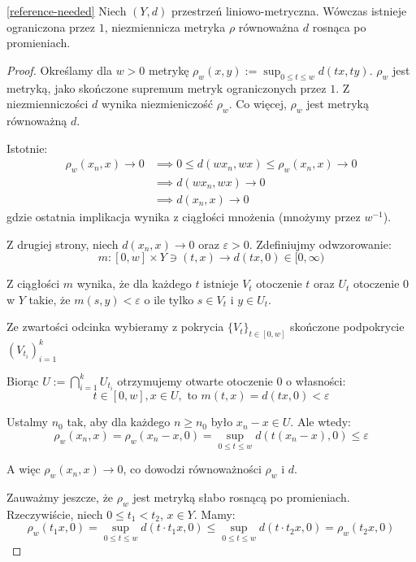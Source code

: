 \begin{thm} \label{thm:eidelheit-mazur} \ref{reference-needed}
  Niech $(Y, d)$ przestrzeń liniowo-metryczna. Wówczas istnieje ograniczona przez $1$, niezmiennicza metryka $\rho$ równoważna $d$ rosnąca po promieniach.
  \begin{proof}
    Określamy dla $w > 0$ metrykę $\rho_w(x, y) := \sup_{0 \leq t \leq w} d(tx, ty)$. $\rho_w$ jest metryką, jako skończone supremum metryk ograniczonych przez $1$. Z niezmienniczości $d$ wynika niezmieniczość $\rho_w$. Co więcej, $\rho_w$ jest metryką równoważną $d$.
    
    Istotnie:
    \begin{align*}
      \rho_w(x_n, x) \to 0 &\implies 0 \leq d(w x_n, wx) \leq \rho_w(x_n,x)  \to 0 \\
      &\implies d(wx_n, wx) \to 0 \\
      &\implies d(x_n, x) \to 0
    \end{align*}
    gdzie ostatnia implikacja wynika z ciągłości mnożenia (mnożymy przez $w^{-1}$).
    
    Z drugiej strony, niech $d(x_n, x) \to 0$ oraz $\varepsilon > 0$. Zdefiniujmy odwzorowanie:
    \[m: [0,w] \times Y \ni (t,x) \to d(tx, 0) \in [0,\infty)\]
    
    Z ciągłości $m$ wynika, że dla każdego $t$ istnieje $V_t$ otoczenie $t$ oraz $U_t$ otoczenie $0$ w $Y$ takie, że $m(s, y) < \varepsilon$ o ile tylko $s \in V_t$ i $y \in U_t$.
    
    Ze zwartości odcinka wybieramy z pokrycia $\{V_t\}_{t \in [0,w]}$ skończone podpokrycie $(V_{t_i})_{i=1}^{k}$
    
    Biorąc $U := \bigcap_{i=1}^k U_{t_i}$ otrzymujemy otwarte otoczenie $0$ o własności:
    \[t \in [0,w], x \in U,\mbox{ to } m(t,x) = d(tx, 0) < \varepsilon\]
    
    Ustalmy $n_0$ tak, aby dla każdego $n \geq n_0$ było $x_n - x \in U$. Ale wtedy:
    \[\rho_w(x_n, x) = \rho_w(x_n - x, 0) = \sup_{0 \leq t \leq w} d(t(x_n - x), 0) \leq \varepsilon\]
    
    A więc $\rho_w(x_n, x) \to 0$, co dowodzi równoważności $\rho_w$ i $d$.
    
    Zauważmy jeszcze, że $\rho_w$ jest metryką słabo rosnącą po promieniach. Rzeczywiście, niech $0 \leq t_1 < t_2$, $x \in Y$. Mamy:
    \[\rho_w(t_1 x, 0) = \sup_{0 \leq t \leq w} d(t \cdot t_1 x, 0) \leq \sup_{0 \leq t \leq w} d(t \cdot t_2 x, 0) = \rho_w(t_2 x, 0)\]
    

\end{proof}
\end{thm}
